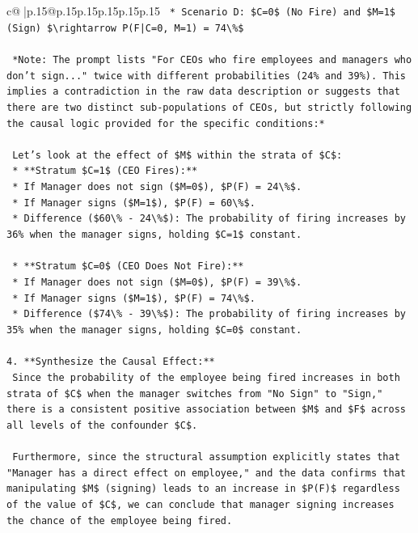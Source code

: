 \documentclass{article}
\begin{document}
{\begin{supertabular}{c@{$\;$}|p{.15\linewidth}@{}p{.15\linewidth}p{.15\linewidth}p{.15\linewidth}p{.15\linewidth}p{.15\linewidth}}
{{{\texttt{    *   Scenario D: \$C=0\$ (No Fire) and \$M=1\$ (Sign) \$\textbackslash{}rightarrow P(F|C=0, M=1) = 74\textbackslash{}\%\$} \\
\\ 
\texttt{    *Note: The prompt lists "For CEOs who fire employees and managers who don't sign..." twice with different probabilities (24\% and 39\%). This implies a contradiction in the raw data description or suggests that there are two distinct sub{-}populations of CEOs, but strictly following the causal logic provided for the specific conditions:*} \\
\\ 
\texttt{    Let's look at the effect of \$M\$ within the strata of \$C\$:} \\
\texttt{    *   **Stratum \$C=1\$ (CEO Fires):**} \\
\texttt{        *   If Manager does not sign (\$M=0\$), \$P(F) = 24\textbackslash{}\%\$.} \\
\texttt{        *   If Manager signs (\$M=1\$), \$P(F) = 60\textbackslash{}\%\$.} \\
\texttt{        *   Difference (\$60\textbackslash{}\% {-} 24\textbackslash{}\%\$): The probability of firing increases by 36\% when the manager signs, holding \$C=1\$ constant.} \\
\\ 
\texttt{    *   **Stratum \$C=0\$ (CEO Does Not Fire):**} \\
\texttt{        *   If Manager does not sign (\$M=0\$), \$P(F) = 39\textbackslash{}\%\$.} \\
\texttt{        *   If Manager signs (\$M=1\$), \$P(F) = 74\textbackslash{}\%\$.} \\
\texttt{        *   Difference (\$74\textbackslash{}\% {-} 39\textbackslash{}\%\$): The probability of firing increases by 35\% when the manager signs, holding \$C=0\$ constant.} \\
\\ 
\texttt{4.  **Synthesize the Causal Effect:**} \\
\texttt{    Since the probability of the employee being fired increases in both strata of \$C\$ when the manager switches from "No Sign" to "Sign," there is a consistent positive association between \$M\$ and \$F\$ across all levels of the confounder \$C\$.} \\
\\ 
\texttt{    Furthermore, since the structural assumption explicitly states that "Manager has a direct effect on employee," and the data confirms that manipulating \$M\$ (signing) leads to an increase in \$P(F)\$ regardless of the value of \$C\$, we can conclude that manager signing increases the chance of the employee being fired.} \\
}}}
\end{supertabular}}
\end{document}
